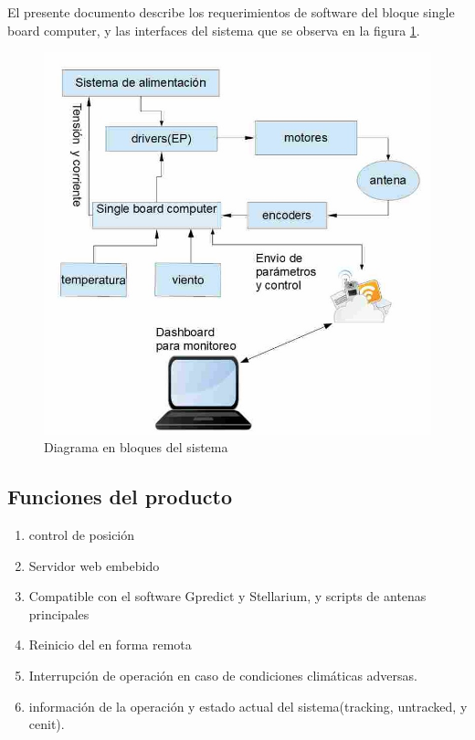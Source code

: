 \documentclass[12pt,a4paper, twosite]{article}
\begin{document}
	 El presente documento describe los requerimientos de software del bloque single board computer, y las interfaces del sistema que se observa en la figura  \ref{fig:diagramaBloques}. 
	\begin{figure}[h!]
		\centering
		\includegraphics[scale=0.5]{bloquesInt.jpg}
		\caption{Diagrama en bloques del sistema}
		\label{fig:diagramaBloques}
	\end{figure}
	\subsection{Funciones del producto}
	\label{sec:orgaf51da6}
	\begin{enumerate}
		\item control de posición
		\item Servidor web embebido 
		\item Compatible con el software Gpredict y Stellarium, y scripts de antenas principales 
		\item Reinicio del en forma remota  
		\item Interrupción de operación en caso de condiciones climáticas adversas. 
		\item información de la operación y estado actual del sistema(tracking, untracked, y cenit). 
	\end{enumerate}
	
\end{document}
